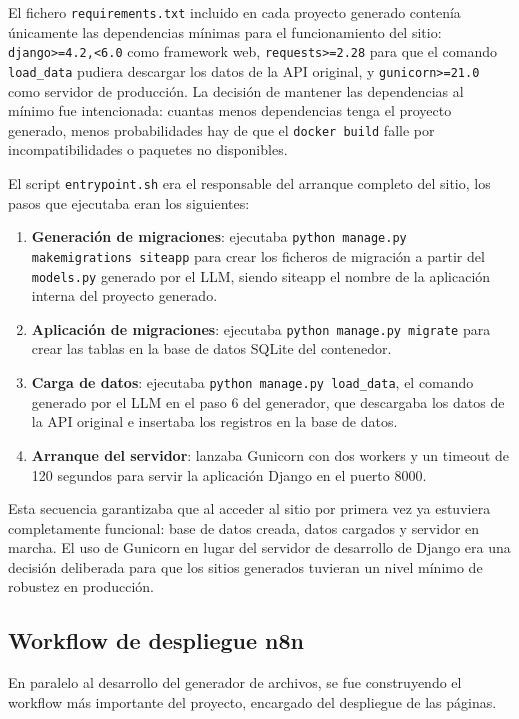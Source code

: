 El fichero \texttt{requirements.txt} incluido en cada proyecto generado contenía únicamente las dependencias mínimas para el funcionamiento del sitio: \texttt{django>=4.2,<6.0} como framework web, \texttt{requests>=2.28} para que el comando \texttt{load\_data} pudiera descargar los datos de la API original, y \texttt{gunicorn>=21.0} como servidor de producción. La decisión de mantener las dependencias al mínimo fue intencionada: cuantas menos dependencias tenga el proyecto generado, menos probabilidades hay de que el \texttt{docker build} falle por incompatibilidades o paquetes no disponibles.

El script \texttt{entrypoint.sh} era el responsable del arranque completo del sitio, los pasos que ejecutaba eran los siguientes:

\begin{enumerate}
    \item \textbf{Generación de migraciones}: ejecutaba \texttt{python manage.py makemigrations siteapp} para crear los ficheros de migración a partir del \texttt{models.py} generado por el LLM, siendo siteapp el nombre de la aplicación interna del proyecto generado.
    \item \textbf{Aplicación de migraciones}: ejecutaba \texttt{python manage.py migrate} para crear las tablas en la base de datos SQLite del contenedor.
    \item \textbf{Carga de datos}: ejecutaba \texttt{python manage.py load\_data}, el comando generado por el LLM en el paso 6 del generador, que descargaba los datos de la API original e insertaba los registros en la base de datos.
    \item \textbf{Arranque del servidor}: lanzaba Gunicorn con dos workers y un timeout de 120 segundos para servir la aplicación Django en el puerto 8000.
\end{enumerate}

Esta secuencia garantizaba que al acceder al sitio por primera vez ya estuviera completamente funcional: base de datos creada, datos cargados y servidor en marcha. El uso de 
Gunicorn en lugar del servidor de desarrollo de Django era una decisión deliberada para que los sitios generados tuvieran un nivel mínimo de robustez en producción.


\subsection{Workflow de despliegue n8n}
\label{subsec:workflow-despliegue}

En paralelo al desarrollo del generador de archivos, se fue construyendo el workflow más importante del proyecto, encargado del despliegue de las páginas.

